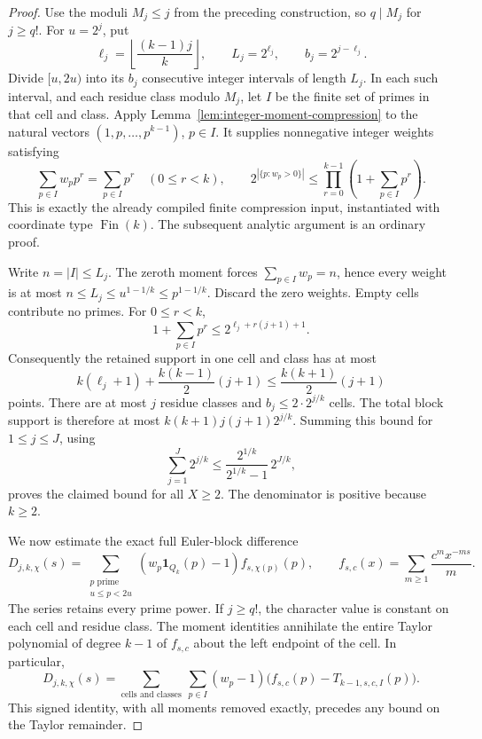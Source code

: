 \documentclass[11pt]{article}
\theoremstyle{definition}
\begin{document}
\begin{proof}
Use the moduli $M_j\le j$ from the preceding construction,
so $q\mid M_j$ for $j\ge q!$.
For $u=2^j$, put
\[
 \ell_j=\left\lfloor\frac{(k-1)j}{k}\right\rfloor,\qquad
 L_j=2^{\ell_j},\qquad b_j=2^{j-\ell_j}.
\]
Divide $[u,2u)$ into its $b_j$ consecutive integer intervals
of length $L_j$. In each such interval, and each residue
class modulo $M_j$, let $I$ be the finite set of primes in
that cell and class. Apply
Lemma~\ref{lem:integer-moment-compression} to the natural
vectors $(1,p,\ldots,p^{k-1})$, $p\in I$.
It supplies nonnegative integer weights satisfying
\[
 \sum_{p\in I}w_pp^r=\sum_{p\in I}p^r\quad(0\le r<k),
 \qquad
 2^{|\{p:w_p>0\}|}\le
       \prod_{r=0}^{k-1}\left(1+\sum_{p\in I}p^r\right).
\]
This is exactly the already compiled finite compression
input, instantiated with coordinate type $\operatorname{Fin}(k)$.
The subsequent analytic argument is an ordinary proof.

Write $n=|I|\le L_j$. The zeroth moment forces
$\sum_{p\in I}w_p=n$, hence every weight is at most
$n\le L_j\le u^{1-1/k}\le p^{1-1/k}$.
Discard the zero weights. Empty cells contribute no primes.
For $0\le r<k$,
\[
 1+\sum_{p\in I}p^r
 \le2^{\ell_j+r(j+1)+1}.
\]
Consequently the retained support in one cell and class has
at most
\[
 k(\ell_j+1)+\frac{k(k-1)}2(j+1)
 \le\frac{k(k+1)}2(j+1)
\]
points. There are at most $j$ residue classes and
$b_j\le2\cdot2^{j/k}$ cells. The total block support is
therefore at most $k(k+1)j(j+1)2^{j/k}$.
Summing this bound for $1\le j\le J$, using
\[
 \sum_{j=1}^J2^{j/k}
 \le\frac{2^{1/k}}{2^{1/k}-1}\,2^{J/k},
\]
proves the claimed bound for all $X\ge2$.
The denominator is positive because $k\ge2$.

We now estimate the exact full Euler-block difference
\[
 D_{j,k,\chi}(s)
 =\sum_{\substack{p\text{ prime}\\u\le p<2u}}
        (w_p\mathbf1_{Q_k}(p)-1)f_{s,\chi(p)}(p),
 \qquad
 f_{s,c}(x)=\sum_{m\ge1}\frac{c^m x^{-ms}}m.
\]
The series retains every prime power.
If $j\ge q!$, the character value is constant on each
cell and residue class. The moment identities annihilate
the entire Taylor polynomial of degree $k-1$ of $f_{s,c}$
about the left endpoint of the cell. In particular,
\[
 D_{j,k,\chi}(s)
 =\sum_{\text{cells and classes}}\ \sum_{p\in I}
       (w_p-1)\bigl(f_{s,c}(p)-T_{k-1,s,c,I}(p)\bigr).
\]
This signed identity, with all moments removed exactly,
precedes any bound on the Taylor remainder.


\end{proof}
\end{document}
